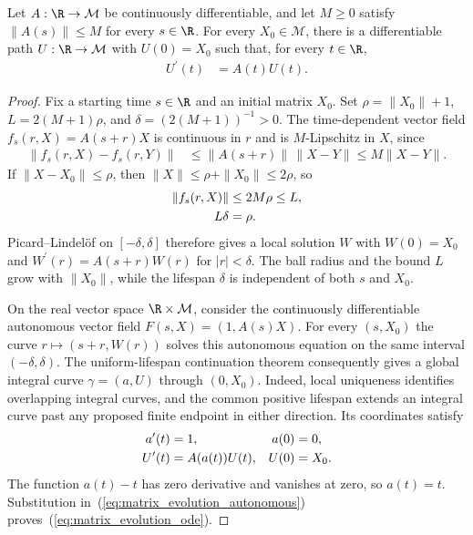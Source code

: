 \begin{theorem}
    \label{thm:matrix_evolution_exists}
    \leanok
    Let $A:\R\to\mathcal M$ be continuously differentiable, and let
    $M\ge0$ satisfy $\|A(s)\|\le M$ for every $s\in\R$.
    For every $X_0\in\mathcal M$, there is a differentiable path
    $U:\R\to\mathcal M$ with $U(0)=X_0$ such that, for every $t\in\R$,
    \begin{align}
        U^{\prime}(t)&=A(t)U(t).
        \label{eq:matrix_evolution_ode}
    \end{align}
\end{theorem}
\begin{proof}\leanok
    Fix a starting time $s\in\R$ and an initial matrix $X_0$.
    Set $\rho=\|X_0\|+1$, $L=2(M+1)\rho$, and
    $\delta=(2(M+1))^{-1}>0$.
    The time-dependent vector field $f_s(r,X)=A(s+r)X$ is continuous
    in $r$ and is $M$-Lipschitz in $X$, since
    \begin{align}
        \|f_s(r,X)-f_s(r,Y)\|
            &\le\|A(s+r)\|\,\|X-Y\|\le M\|X-Y\|.
        \label{eq:matrix_evolution_lipschitz}
    \end{align}
    If $\|X-X_0\|\le\rho$, then
    $\|X\|\le\rho+\|X_0\|\le2\rho$, so
    \begin{align}
        \|f_s(r,X)\|&\le2M\rho\le L,
        \label{eq:matrix_evolution_lifespan}\\
        L\delta&=\rho.\notag
    \end{align}
    Picard--Lindel\"of on $[-\delta,\delta]$ therefore gives a local
    solution $W$ with $W(0)=X_0$ and
    $W^{\prime}(r)=A(s+r)W(r)$ for $|r|<\delta$.
    The ball radius and the bound $L$ grow with $\|X_0\|$, while the
    lifespan $\delta$ is independent of both $s$ and $X_0$.

    On the real vector space $\R\times\mathcal M$, consider the
    continuously differentiable autonomous vector field
    $F(s,X)=(1,A(s)X)$. For every $(s,X_0)$ the curve
    $r\mapsto(s+r,W(r))$ solves this autonomous equation on the same
    interval $(-\delta,\delta)$.
    The uniform-lifespan continuation theorem consequently gives a global
    integral curve $\gamma=(a,U)$ through $(0,X_0)$.
    Indeed, local uniqueness identifies overlapping integral curves, and
    the common positive lifespan extends an integral curve past any
    proposed finite endpoint in either direction.
    Its coordinates satisfy
    \begin{align}
        a^{\prime}(t)&=1, & a(0)&=0,
        \label{eq:matrix_evolution_autonomous}\\
        U^{\prime}(t)&=A(a(t))U(t), & U(0)&=X_0.\notag
    \end{align}
    The function $a(t)-t$ has zero derivative and vanishes at zero, so
    $a(t)=t$. Substitution in~(\ref{eq:matrix_evolution_autonomous})
    proves~(\ref{eq:matrix_evolution_ode}).
\end{proof}

